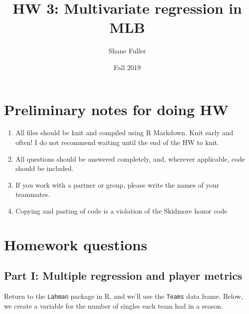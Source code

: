 \documentclass[]{article}
\title{HW 3: Multivariate regression in MLB}
\author{Shane Fuller}
\date{Fall 2019}
\newenvironment{Shaded}{\begin{snugshade}}{\end{snugshade}}
\newcommand{\DataTypeTok}[1]{\textcolor[rgb]{0.13,0.29,0.53}{#1}}
\newcommand{\DecValTok}[1]{\textcolor[rgb]{0.00,0.00,0.81}{#1}}
\newcommand{\KeywordTok}[1]{\textcolor[rgb]{0.13,0.29,0.53}{\textbf{#1}}}
\newcommand{\NormalTok}[1]{#1}
\newcommand{\OperatorTok}[1]{\textcolor[rgb]{0.81,0.36,0.00}{\textbf{#1}}}
\newcommand{\StringTok}[1]{\textcolor[rgb]{0.31,0.60,0.02}{#1}}
\begin{document}
\maketitle

\hypertarget{preliminary-notes-for-doing-hw}{%
\section{Preliminary notes for doing
HW}\label{preliminary-notes-for-doing-hw}}

\begin{enumerate}
\def\labelenumi{\arabic{enumi}.}
\item
  All files should be knit and compiled using R Markdown. Knit early and
  often! I do not recommend waiting until the end of the HW to knit.
\item
  All questions should be answered completely, and, wherever applicable,
  code should be included.
\item
  If you work with a partner or group, please write the names of your
  teammates.
\item
  Copying and pasting of code is a violation of the Skidmore honor code
\end{enumerate}

\hypertarget{homework-questions}{%
\section{Homework questions}\label{homework-questions}}

\hypertarget{part-i-multiple-regression-and-player-metrics}{%
\subsection{Part I: Multiple regression and player
metrics}\label{part-i-multiple-regression-and-player-metrics}}

Return to the \texttt{Lahman} package in R, and we'll use the
\texttt{Teams} data frame. Below, we create a variable for the number of
singles each team had in a season.

\begin{Shaded}
\end{Shaded}
\end{document}
